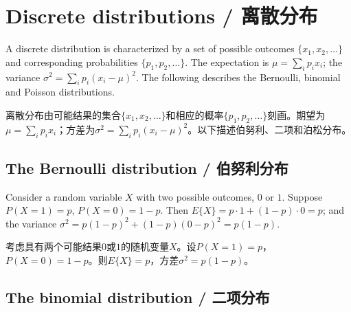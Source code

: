 \section{Discrete distributions / 离散分布}

\begin{original}
A discrete distribution is characterized by a set of possible outcomes $\{x_1, x_2, \ldots\}$ and corresponding probabilities $\{p_1, p_2, \ldots\}$. The expectation is $\mu = \sum_i p_i x_i$; the variance $\sigma^2 = \sum_i p_i(x_i - \mu)^2$. The following describes the Bernoulli, binomial and Poisson distributions.
\end{original}
\begin{translation}
离散分布由可能结果的集合$\{x_1, x_2, \ldots\}$和相应的概率$\{p_1, p_2, \ldots\}$刻画。期望为$\mu = \sum_i p_i x_i$；方差为$\sigma^2 = \sum_i p_i(x_i - \mu)^2$。以下描述伯努利、二项和泊松分布。
\end{translation}

\subsection{The Bernoulli distribution / 伯努利分布}

\begin{original}
Consider a random variable $X$ with two possible outcomes, $0$ or $1$. Suppose $P(X = 1) = p$, $P(X = 0) = 1 - p$. Then $E\{X\} = p \cdot 1 + (1 - p) \cdot 0 = p$; and the variance $\sigma^2 = p(1-p)^2 + (1-p)(0-p)^2 = p(1-p)$.
\end{original}
\begin{translation}
考虑具有两个可能结果$0$或$1$的随机变量$X$。设$P(X = 1) = p$，$P(X = 0) = 1-p$。则$E\{X\} = p$，方差$\sigma^2 = p(1-p)$。
\end{translation}

\subsection{The binomial distribution / 二项分布}

